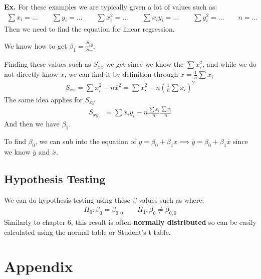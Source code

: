 \documentclass[12pt,letterpaper]{article} \usepackage{amsmath} \usepackage{graphicx} \usepackage[margin=1in]{geometry} \usepackage{longtable}  \usepackage{amssymb}
\begin{document}
	\begin{mdframed}
		\textbf{Ex.} For these examples we are typically given a lot of values such as:
		\begin{align*}
			\sum x_i = ... \qquad \sum y_i = ... \qquad \sum x^2_i = ... \qquad \sum x_iy_i = ... \qquad \sum y_i^2 = ... \qquad n = ...
		\end{align*}
		Then we need to find the equation for linear regression. 
		
		We know how to get $\beta_1 = \frac{S_{xy}}{S_{xx}}$.
		
		Finding these values such as $S_{xx}$ we get since we know the $\sum x_i^2$, and while we do not directly know $\overline x$, we can find it by definition through $\overline x = \frac{1}{n}\sum x_i$
		\begin{align*}
			S_{xx} = \sum x_i^2 - n\overline x ^2 = \sum x_i^2 - n\left(\frac{1}{n}\sum x_i\right)^2
		\end{align*}
		The same idea applies for $S_{xy}$
		\begin{align*}
			S_{xy} &= \sum x_iy_i - n\frac{\sum x_i}{n}\frac{\sum y_i}{n}
		\end{align*}
		And then we have $\beta_1$. 
		
		To find $\beta_0$, we can sub into the equation of $y=\beta_0 + \beta_1 x \implies \overline y = \beta_0 + \beta_1 \overline x$ since we know $\overline y$ and $\overline x$.
	\end{mdframed}
	
	\subsection{Hypothesis Testing}
	We can do hypothesis testing using these $\beta$ values such as where:
	\begin{align*}
		H_0: \beta_0 = \beta_{0,0} \qquad H_1: \beta_0 \ne \beta_{0,0}
	\end{align*}
	Similarly to chapter 6, this result is often \textbf{normally distributed} so can be easily calculated using the normal table or Student's t table. 
	
	\newpage
	\section{Appendix}
\end{document}
